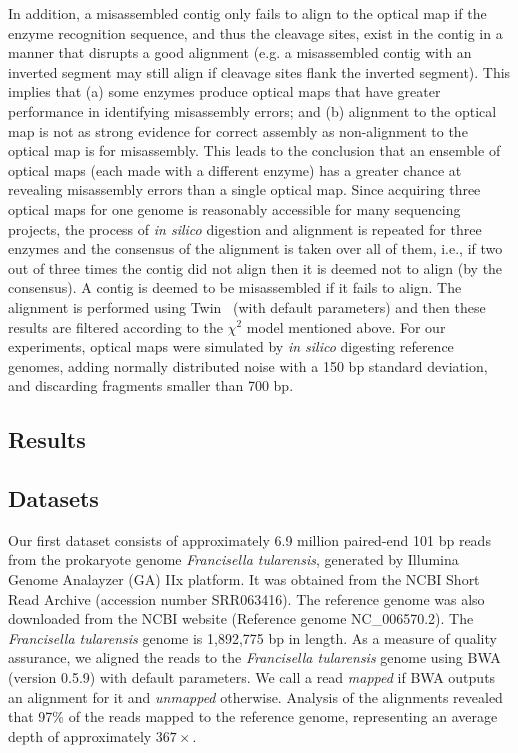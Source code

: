 \documentclass[doctor]{thesis}
\begin{document}
In addition, a misassembled contig only fails to align to the optical map if the enzyme recognition sequence, and thus the cleavage sites, exist in the contig in a manner that disrupts a good alignment (e.g. a misassembled contig with an inverted segment may still align if cleavage sites flank the inverted segment).
This implies that (a) some enzymes produce optical maps that have greater performance in identifying misassembly errors; and (b) alignment to the optical map is not as strong evidence for correct assembly as non-alignment to the optical map is for misassembly. 
This leads to the conclusion that an ensemble of optical maps (each made with a different enzyme) has a greater chance at revealing misassembly errors than a single optical map.  
Since acquiring three optical maps for one genome is reasonably accessible for many sequencing projects, the process of {\em in silico} digestion and alignment is repeated for three enzymes and the consensus of the alignment is taken over all of them, i.e., if two out of three times the contig did not align then it is deemed not to align (by the consensus).
A contig is deemed to be misassembled if it fails to align. The alignment is performed using Twin~\cite{wabi2014} (with default parameters) and then these results are filtered according to the $ \chi^2 $ model mentioned above.  
For our experiments, optical maps were simulated by {\em in silico} digesting reference genomes, adding normally distributed noise with a 150 bp standard deviation, and discarding fragments smaller than 700 bp.


                     
\makeatletter{}\subsection{Results} \label{sec:results} 

\subsection{Datasets} \label{subsec:data}

Our first dataset consists of approximately 6.9 million paired-end 101 bp reads from the prokaryote genome {\em Francisella tularensis}, generated by Illumina Genome Analayzer (GA) IIx platform. 
It was obtained from the NCBI Short Read Archive (accession number SRR063416). The reference genome was also downloaded from the NCBI website (Reference genome NC\_006570.2).  
The {\em  Francisella tularensis} genome is 1,892,775 bp in length. As a measure of quality assurance, we aligned the reads to the {\em Francisella tularensis} genome using BWA (version 0.5.9) \cite{bwa} with default parameters.  
We call a read {\em mapped} if BWA outputs an alignment for it and {\em unmapped} otherwise.  
Analysis of the alignments revealed that 97\% of the reads mapped to the reference genome, representing an average depth of approximately $367\times$.  
\end{document}
